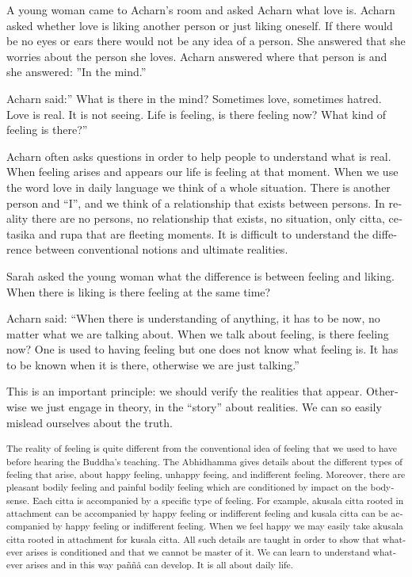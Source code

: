 \textdutch{A young woman came to Acharn's room and asked Acharn what
love is. Acharn asked whether love is liking another person or just
liking oneself. If there would be no eyes or ears there would not be any
idea of a person. She answered that she worries about the person she
loves. Acharn answered where that person is and she answered: ''In the
mind.'' }

\textdutch{Acharn said:'' What is there in the mind? Sometimes love,
sometimes hatred. Love is real. It is not seeing. Life is feeling, is
there feeling now? What kind of feeling is there?'' }

\textdutch{Acharn often asks questions in order to help people to
understand what is real. When feeling arises and appears our life is
feeling at that moment. When we use the word love in daily language we
think of a whole situation. There is another person and ``I'', and we
think of a relationship that exists between persons. In reality there
are no persons, no relationship that exists, no situation, only citta,
cetasika and rupa that are fleeting moments. It is difficult to
understand the difference between conventional notions and ultimate
realities.}

\textdutch{Sarah asked the young woman what the difference is between
feeling and liking. When there is liking is there feeling at the same
time?}

\textdutch{Acharn said: ``When there is understanding of anything, it
has to be now, no matter what we are talking about. When we talk about
feeling, is there feeling now? One is used to having feeling but one
does not know what feeling is. It has to be known when it is there,
otherwise we are just talking.'' }

\textdutch{This is an important principle: we should verify the
realities that appear. Otherwise we just engage in theory, in the
``story'' about realities. We can so easily mislead ourselves about the
truth. }

\textsuperscript{\textdutch{The reality of feeling is quite different
from the conventional idea of feeling that we used to have before
hearing the Buddha's teaching. }\textenglish[variant=american]{The
Abhidhamma gives details about the different types of
}\textdutch{feeling}\textenglish[variant=american]{ that arise,
}\textdutch{about happy feeling, unhappy feeing, and indifferent
feeling. Moreover, there are pleasant bodily feeling and painful bodily
feeling which are conditioned by impact on the bodysense. Each citta is
accompanied by a specific type of feeling. For example, akusala citta
rooted in attachment can be accompanied by happy feeling or indifferent
feeling and kusala citta can be accompanied by happy feeling or
indifferent feeling. W}\textenglish[variant=american]{hen we feel
happy}\textdutch{ we may easily take akusala citta rooted in attachment
for kusala citta. All such details are taught in order to show that
}\textenglish[variant=american]{whatever arises is conditioned and that
we cannot be master of it. We can learn to understand whatever arises
and in this way }\textdutch{paññå}\textenglish[variant=american]{ can
develop. It is all about daily life.}\textdutch{ }}

